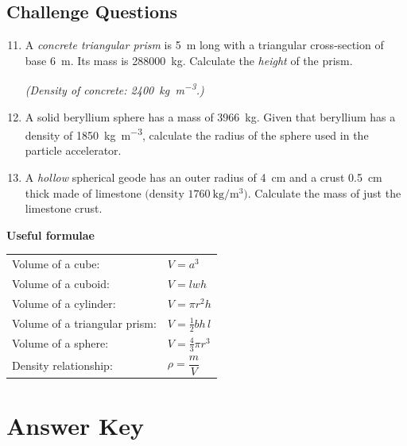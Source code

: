 \documentclass{article}
\begin{document}
\subsection*{Challenge Questions}

\begin{enumerate}
\setcounter{enumi}{10}
\item A \emph{concrete triangular prism} is \SI{5}{\metre} long with a triangular cross‐section of base \SI{6}{\metre}. Its mass is \SI{288000}{\kilogram}.  Calculate the \emph{height} of the prism.\par
\textit{(Density of concrete: \SI{2400}{\kilogram\per\metre\cubed}.)}

\item A solid beryllium sphere has a mass of \SI{3966}{\kilogram}.  Given that beryllium has a density of \SI{1850}{\kilogram\per\metre\cubed}, calculate the radius of the sphere used in the particle accelerator.

\item A \emph{hollow} spherical geode has an outer radius of \SI{4}{\centi\metre} and a crust \SI{0.5}{\centi\metre} thick made of limestone \(\bigl(\text{density } \SI{1760}{\kilogram\per\metre\cubed}\bigr)\). Calculate the mass of just the limestone crust.
\end{enumerate}

\vspace{1em}
\noindent\textbf{Useful formulae}\\[0.3em]
\begin{tabular}{ll}
Volume of a cube: & $V = a^{3}$\\
Volume of a cuboid: & $V = l w h$\\
Volume of a cylinder: & $V = \pi r^{2} h$\\
Volume of a triangular prism: & $V = \tfrac12 b h \, l$\\
Volume of a sphere: & $V = \tfrac43 \pi r^{3}$\\
Density relationship: & $\rho = \dfrac{m}{V}$
\end{tabular}

\newpage
\section*{Answer Key}
\end{document}
